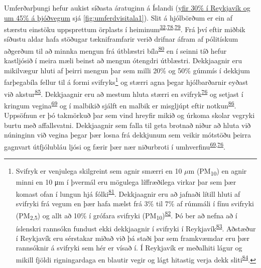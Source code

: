 \documentclass[icelandic,]{book}
\let\rmarkdownfootnote\footnote%
\def\footnote{\protect\rmarkdownfootnote}
\begin{document}
Umferðarþungi hefur aukist síðasta áratuginn á Íslandi (\href{http://www.vegagerdin.is/upplysingar-og-utgafa/umferdin/tolfrumferdar/}{yfir 30\% í Reykjavík og um 45\% á þjóðvegum} sjá \ref{fig:umferdvisitala1}). Slit á hjólbörðum er ein af stærstu einstöku uppsprettum örplasts í heiminum\textsuperscript{\protect\hyperlink{ref-sundt2014sources}{32},\protect\hyperlink{ref-lassen2015microplastics}{78},\protect\hyperlink{ref-essel2015sources}{79}}. Frá því eftir miðbik síðustu aldar hafa stöðugar tækniframfarir verið drifnar áfram af pólitískum aðgerðum til að minnka mengun frá útblæstri bíla\textsuperscript{\protect\hyperlink{ref-lee2007innovation}{80}} en í seinni tíð hefur kastljósið í meira mæli beinst að mengun ótengdri útblæstri. Dekkjaagnir eru mikilvægur hluti af þeirri mengun þar sem milli 20\% og 50\% gúmmís í dekkjum farþegabíla fellur til á formi svifryks\footnote{Svifryk er venjulega skilgreint sem agnir smærri en 10 \(\mu\)m (PM\textsubscript{10}) en agnir minni en 10 μm í þvermál eru mögulega líffræðilega virkar þar sem þær komast ofan í lungun hjá fólki\textsuperscript{\protect\hyperlink{ref-heyder1986deposition}{81}}. Dekkjaagnir eru að jafnaði lítill hluti af svifryki frá vegum en þær hafa mælst frá 3\% til 7\% af rúmmáli í fínu svifryki (PM\textsubscript{2,5}) og allt að 10\% í grófara svifryki (PM\textsubscript{10})\textsuperscript{\protect\hyperlink{ref-grigoratos2014non}{82}}. Þó ber að nefna að í íslenskri rannsókn fundust ekki dekkjaagnir í svifryki í Reykjavík\textsuperscript{\protect\hyperlink{ref-Efla2015}{83}}. Aðstæður í Reykjavík eru sérstakar miðað við þá staði þar sem framkvæmdar eru þær rannsóknir á svifryki sem hér er vísað í. Í Reykjavík er meðalhiti lágur og mikill fjöldi rigningardaga en blautir vegir og lágt hitastig verja dekk sliti\textsuperscript{\protect\hyperlink{ref-le1998evaluation}{84}}.} og stærri agna þegar hjólbarðarnir eyðast við akstur\textsuperscript{\protect\hyperlink{ref-atech2001national}{85}}. Dekkjaagnir eru að mestum hluta stærri en svifryk\textsuperscript{\protect\hyperlink{ref-kreider2010physical}{76}} og setjast í kringum vegina\textsuperscript{\protect\hyperlink{ref-Cadle1978}{69}} og í malbikið sjálft en malbik er misgljúpt eftir notkun\textsuperscript{\protect\hyperlink{ref-Verschoor2016}{86}}. Uppsöfnun er þó takmörkuð þar sem vind hreyfir mikið og úrkoma skolar vegryki burtu með affallsvatni. Dekkjaagnir sem falla til geta brotnað niður að hluta við núninginn við vegina þegar þær losna frá dekkjunum sem veikir mótstöðu þeirra gagnvart útfjólubláu ljósi og færir þær nær niðurbroti í umhverfinu\textsuperscript{\protect\hyperlink{ref-Cadle1978}{69},\protect\hyperlink{ref-kreider2010physical}{76}}.
\end{document}
